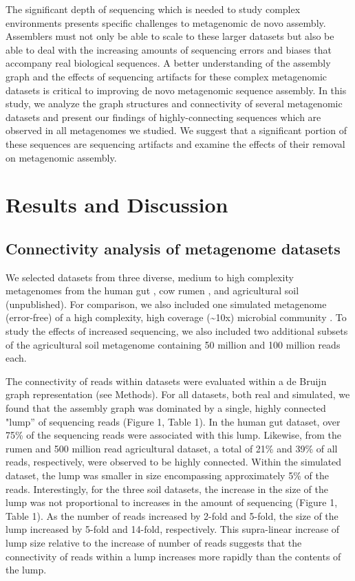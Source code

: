 \documentclass[11pt]{article} %
\begin{document}
The significant depth of sequencing which is needed to study complex environments presents specific challenges to metagenomic de novo assembly.  Assemblers must not only be able to scale to these larger datasets but also be able to deal with the increasing amounts of sequencing errors and biases that accompany real biological sequences.   A better understanding of the assembly graph and the effects of sequencing artifacts for these complex metagenomic datasets is critical to improving de novo metagenomic sequence assembly.  In this study, we analyze the graph structures and connectivity of several metagenomic datasets and present our findings of highly-connecting sequences which are observed in all metagenomes we studied.  We suggest that a significant portion of these sequences are sequencing artifacts and examine the effects of their removal on metagenomic assembly.

\section{Results and Discussion}
\subsection{Connectivity analysis of metagenome datasets}

We selected datasets from three diverse, medium to high complexity metagenomes from the human gut \cite{Qin:2010p189}, cow rumen \cite{Hess:2011p686}, and agricultural soil (unpublished). For comparison, we also included one simulated metagenome (error-free) of a high complexity, high coverage (\textasciitilde{}10x) microbial community \cite{Pignatelli:2011p742}. To study the effects of increased sequencing, we also included two additional subsets of the agricultural soil metagenome containing 50 million and 100 million reads each. 

The connectivity of reads within datasets were evaluated within a de Bruijn graph representation (see Methods). For all datasets, both real and simulated, we found that the assembly graph was dominated by a single, highly connected "lump'' of sequencing reads (Figure 1, Table 1). In the human gut dataset, over 75\% of the sequencing reads were associated with this lump. Likewise, from the rumen and 500 million read agricultural dataset, a total of 21\% and 39\% of all reads, respectively, were observed to be highly connected. Within the simulated dataset, the lump was smaller in size encompassing approximately 5\% of the reads. Interestingly, for the three soil datasets, the increase in the size of the lump was not proportional to increases in the amount of sequencing (Figure 1, Table 1).  As the number of reads increased by 2-fold and 5-fold, the size of the lump increased by 5-fold and 14-fold, respectively. This supra-linear increase of lump size relative to the increase of number of reads suggests that the connectivity of reads within a lump increases more rapidly than the contents of the lump.  
\end{document}
